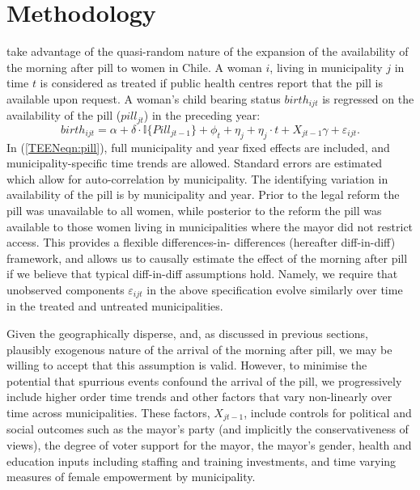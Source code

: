 \section{Methodology}
\label{TEENscn:ID}
\Person take advantage of the quasi-random nature of the expansion of the 
availability of the morning after pill to women in Chile.  A woman $i$, living
in municipality $j$ in time $t$ is considered as treated if public health 
centres report that the pill is available upon request.  A woman's child 
bearing status $birth_{ijt}$ is regressed on the availability of the pill 
($pill_{jt}$) in the preceding year:
\begin{equation}
 \label{TEENeqn:pill}
birth_{ijt} = \alpha + \delta\cdot \mathbb{I}\{Pill_{jt-1}\} + \phi_t + \eta_j + 
\eta_j\cdot t + X_{jt-1}\gamma + \varepsilon_{ijt}.
\end{equation}
In (\ref{TEENeqn:pill}), full municipality and year fixed effects are included,
and municipality-specific time trends are allowed.  Standard errors are 
estimated which allow for auto-correlation by municipality.  The identifying 
variation in availability of the pill is by municipality and year.  Prior to 
the legal reform the pill was unavailable to all women, while posterior to the
reform the pill was available to those women living in municipalities where the
mayor did not restrict access.  This provides a flexible differences-in-%
differences (hereafter diff-in-diff) framework, and allows us to causally 
estimate the effect of the morning after pill if we believe that typical 
diff-in-diff assumptions hold.  Namely, we require that unobserved components 
$\varepsilon_{ijt}$ in the above specification evolve similarly over time in 
the treated and untreated municipalities.

Given the geographically disperse, and, as discussed in previous sections,
plausibly exogenous nature of the arrival of the morning after pill, we may be
willing to accept that this assumption is valid.  However, to minimise the 
potential that spurrious events confound the arrival of the pill, we 
progressively include higher order time trends and other factors that vary 
non-linearly over time across municipalities.  These factors, $X_{jt-1}$, 
include controls for political and social outcomes such as the mayor's party
(and implicitly the conservativeness of views), the degree of voter support for
the mayor, the mayor's gender, health and education inputs including staffing
and training investments, and time varying measures of female empowerment by
municipality.

